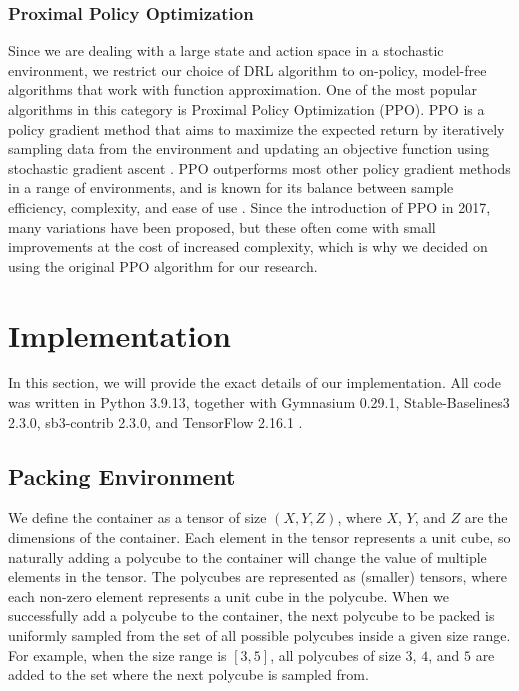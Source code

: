 \documentclass[conference]{IEEEtran}
\begin{document}
\subsubsection{Proximal Policy Optimization}
Since we are dealing with a large state and action space in a stochastic environment, we restrict our choice of DRL algorithm to on-policy, model-free algorithms that work with function approximation.
One of the most popular algorithms in this category is Proximal Policy Optimization (PPO).
PPO is a policy gradient method that aims to maximize the expected return by iteratively sampling data from the environment and updating an objective function using stochastic gradient ascent \cite{Schulman2017}.
PPO outperforms most other policy gradient methods in a range of environments, and is known for its balance between sample efficiency, complexity, and ease of use \cite{Schulman2017}.
Since the introduction of PPO in 2017, many variations have been proposed, but these often come with small improvements at the cost of increased complexity, which is why we decided on using the original PPO algorithm for our research.

%
%
\section{Implementation} \label{sec:implementation}
In this section, we will provide the exact details of our implementation.
All code was written in Python 3.9.13, together with Gymnasium 0.29.1, Stable-Baselines3 2.3.0, sb3-contrib 2.3.0, and TensorFlow 2.16.1 \cite{gymnasium} \cite{stable-baselines3} \cite{tensorflow}.

\subsection{Packing Environment}
We define the container as a tensor of size $(X, Y, Z)$, where $X$, $Y$, and $Z$ are the dimensions of the container.
Each element in the tensor represents a unit cube, so naturally adding a polycube to the container will change the value of multiple elements in the tensor.
The polycubes are represented as (smaller) tensors, where each non-zero element represents a unit cube in the polycube.
When we successfully add a polycube to the container, the next polycube to be packed is uniformly sampled from the set of all possible polycubes inside a given size range.
For example, when the size range is $[3, 5]$, all polycubes of size $3$, $4$, and $5$ are added to the set where the next polycube is sampled from.
\end{document}
